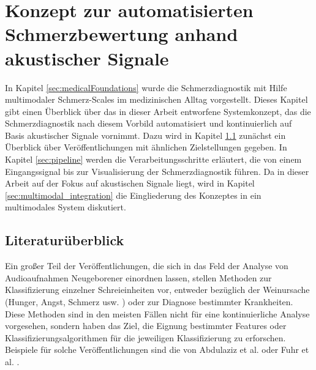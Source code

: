\chapter{Konzept zur automatisierten Schmerzbewertung anhand akustischer Signale}
\label{sec:concept}

In Kapitel \ref{sec:medicalFoundations} wurde die Schmerzdiagnostik mit Hilfe multimodaler Schmerz-Scales im medizinischen Alltag vorgestellt. Dieses Kapitel gibt einen Überblick über das in dieser Arbeit entworfene Systemkonzept, das die Schmerzdiagnostik nach diesem Vorbild automatisiert und kontinuierlich auf Basis akustischer Signale vornimmt. Dazu wird in Kapitel \ref{sec:system_literature} zunächst ein Überblick über Veröffentlichungen mit ähnlichen Zielstellungen gegeben. In Kapitel \ref{sec:pipeline} werden die Verarbeitungsschritte erläutert, die von einem Eingangssignal bis zur Visualisierung der Schmerzdiagnostik führen. Da in dieser Arbeit auf der Fokus auf akustischen Signale liegt, wird in Kapitel \ref{sec:multimodal_integration} die Eingliederung des Konzeptes in ein multimodales System diskutiert.

\section{Literaturüberblick}
\label{sec:system_literature}

Ein großer Teil der Veröffentlichungen, die sich in das Feld der Analyse von Audioaufnahmen Neugeborener einordnen lassen, stellen Methoden zur Klassifizierung einzelner Schreieinheiten vor, entweder bezüglich der Weinursache (Hunger, Angst, Schmerz usw. ) oder zur Diagnose bestimmter Krankheiten. Diese Methoden sind in den meisten Fällen nicht für eine kontinuierliche Analyse vorgesehen, sondern haben das Ziel, die Eignung bestimmter Features oder Klassifizierungsalgorithmen für die jeweiligen Klassifizierung zu erforschen. Beispiele für solche Veröffentlichungen sind die von Abdulaziz et al. \cite{class_abdulaziz} oder Fuhr et al. \cite{comparisonOfLearning}.

